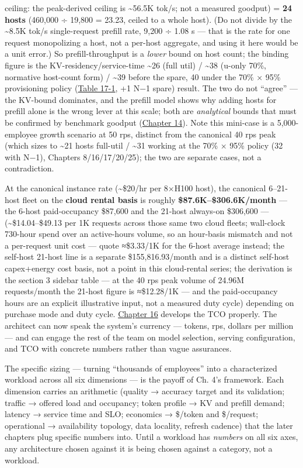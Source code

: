 ceiling: the peak-derived ceiling is \textasciitilde56.5K tok/s; not a
measured goodput) = \textbf{24 hosts} (460,000 ÷ 19,800 = 23.23, ceiled
to a whole host). (Do not divide by the \textasciitilde8.5K tok/s
single-request prefill rate, 9,200 ÷ 1.08 s --- that is the rate for one
request monopolizing a host, not a per-host aggregate, and using it here
would be a unit error.) So prefill-throughput is a \emph{lower} bound on
host count; the binding figure is the KV-residency/service-time
\textasciitilde26 (full util) / \textasciitilde38 (u-only 70\%,
normative host-count form) / \textasciitilde39 before the spare, 40
under the 70\% × 95\% provisioning policy (\hyperref[tab:17.1]{Table 17-1}, +1 N−1 spare)
result. The two do not ``agree'' --- the KV-bound dominates, and the
prefill model shows why adding hosts for prefill alone is the wrong
lever at this scale; both are \emph{analytical} bounds that must be
confirmed by benchmark goodput (\hyperref[chap:14]{Chapter 14}). Note this mini-case is a
5,000-employee growth scenario at 50 rps, distinct from the canonical 40
rps peak (which sizes to \textasciitilde21 hosts full-util /
\textasciitilde31 working at the 70\% × 95\% policy (32 with N−1),
Chapters 8/16/17/20/25); the two are separate cases, not a
contradiction.

At the canonical instance rate (\textasciitilde\$20/hr per 8×H100 host),
the canonical 6--21-host fleet on the \textbf{cloud rental basis} is
roughly \textbf{\$87.6K--\$306.6K/month} --- the 6-host paid-occupancy
\$87,600 and the 21-host always-on \$306,600 ---
(\textasciitilde\$14.04--\$49.13 per 1K requests across those same two
cloud fleets; wall-clock 730-hour spend over an active-hours volume, so
an hour-basis mismatch and not a per-request unit cost --- quote
≈\$3.33/1K for the 6-host average instead; the self-host 21-host line is
a separate \$155,816.93/month and is a distinct self-host capex+energy
cost basis, not a point in this cloud-rental series; the derivation is
the section 3 sidebar table --- at the 40 rps peak volume of 24.96M
requests/month the 21-host figure is ≈\$12.28/1K --- and the
paid-occupancy hours are an explicit illustrative input, not a measured
duty cycle) depending on purchase mode and duty cycle. \hyperref[chap:16]{Chapter 16}
develops the TCO properly. The architect can now speak the system's
currency --- tokens, rps, dollars per million --- and can engage the
rest of the team on model selection, serving configuration, and TCO with
concrete numbers rather than vague assurances.

The specific sizing --- turning ``thousands of employees'' into a
characterized workload across all six dimensions --- is the payoff of
Ch. 4's framework. Each dimension carries an arithmetic (quality →
accuracy target and its validation; traffic → offered load and
occupancy; token profile → KV and prefill demand; latency → service time
and SLO; economics → \$/token and \$/request; operational → availability
topology, data locality, refresh cadence) that the later chapters plug
specific numbers into. Until a workload has \emph{numbers} on all six
axes, any architecture chosen against it is being chosen against a
category, not a workload.
